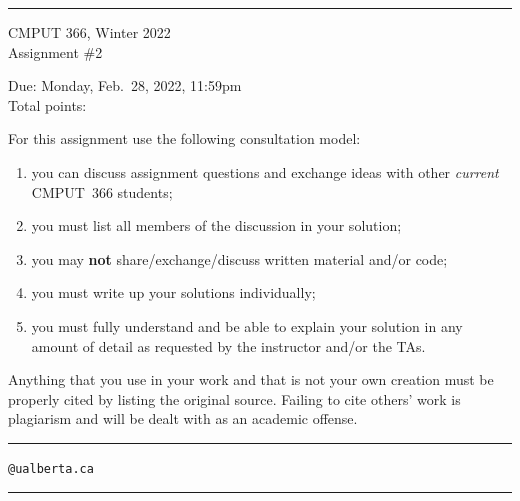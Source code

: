 \documentclass{article}
\newcounter{totalpoints}
\begin{document}
{\bigskip\hrule\bigskip
\huge
\noindent CMPUT 366, Winter 2022\\
Assignment \#2

\large
Due: Monday, Feb.\ 28, 2022, 11:59pm\\
Total points: 

For this assignment use the following consultation model:
\begin{enumerate}

\item you can discuss assignment questions and exchange ideas with other \emph{current} CMPUT~366 students;

\item you must list all members of the discussion in your solution;

\item you may {\bf not} share/exchange/discuss written material and/or code;

\item you must write up your solutions individually;

\item you must fully understand and be able to explain your solution in any amount of detail as requested by the instructor and/or the TAs.

\end{enumerate}

Anything that you use in your work and that is not your own creation must be properly cited by listing the original source. Failing to cite others' work is plagiarism and will be dealt with as an academic offense.


\bigskip\bigskip\hrule\bigskip

\vspace{1cm}
\hspace{1cm}{\bf First name:} \underline{\hspace{7cm}}

\vspace{1cm}
\hspace{1cm}{\bf Last name:} \underline{\hspace{7cm}}

\vspace{1cm}
\hspace{1cm}{\bf CCID:} \underline{\hspace{5.5cm}}\verb|@ualberta.ca|

\vspace{1cm}
\hspace{1cm}{\bf Collaborators:} \underline{\hspace{6.5cm}}

\vspace{1cm}
\bigskip\hrule\bigskip
}
\end{document}
